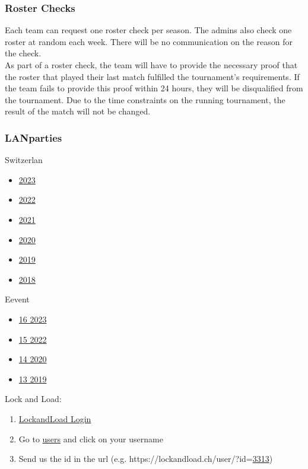 \documentclass{article}
\begin{document}
\subsubsection{Roster Checks}\label{rostercheck}
Each team can request one roster check per season. The admins also check one roster at random each week. There will be no communication on the reason for the check.\\
As part of a roster check, the team will have to provide the necessary proof that the roster that played their last match fulfilled the tournament's requirements. If the team fails to provide this proof within 24 hours, they will be disqualified from the tournament. Due to the time constraints on the running tournament, the result of the match will not be changed.

\subsubsection{LANparties}\label{lans}
Switzerlan
\begin{itemize}
    \item \href{https://battlefy.com/switzerlan-2023/switzerlan-2023-counter-strike-2/65293e1a490b280d6f6adcb0/participants}{2023}
    \item \href{https://battlefy.com/switzerlan-2022/switzerlan-2022-csgo/634937c11ecc2379690e86f8/participants}{2022}
    \item \href{https://battlefy.com/switzerlan-2021/switzerlan-2021-csgo/613e02153a882b30a4149fc3/participants}{2021}
    \item \href{https://battlefy.com/switzerlan-2020/switzerlan-2020-csgo/5f806e118f28e0606c16e93a/participants}{2020}
    \item \href{https://battlefy.com/switzerlan-2019/csgo-5on5-main-tournament/5dd7f3c10f8e011abc0fd63f/participants}{2019}
    \item \href{https://battlefy.com/switzerlan-2018/csgo-5on5-main-tournament/5bb561bd0983dd03b26db586/participants}{2018}
\end{itemize}
Eevent
\begin{itemize}
    \item \href{https://16.eevent.ch/turnier/?do=teilnehmer&id=268}{16 2023}
    \item \href{https://15.eevent.ch/turnier/?do=teilnehmer&id=244}{15 2022}
    \item \href{https://14.eevent.ch/turnier/?do=teilnehmer&id=188}{14 2020}
    \item \href{https://13.eevent.ch/turnier/?do=teilnehmer&id=149}{13 2019}
\end{itemize}
Lock and Load:
\begin{enumerate}
 \item \href{https://lockandload.ch/user/?do=login}{LockandLoad Login}
 \item Go to \href{https://lockandload.ch/online/}{users} and click on your username
 \item Send us the id in the url (e.g. https://lockandload.ch/user/?id=\underline{3313})
\end{enumerate}
\end{document}
